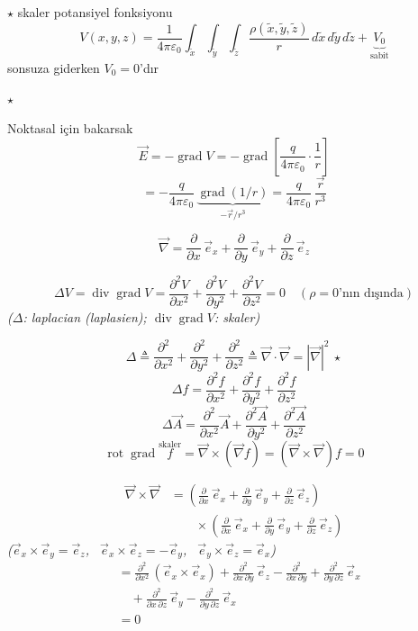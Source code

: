 \documentclass[11pt,a4paper]{article}
\begin{document}
\noindent $\star$ skaler potansiyel fonksiyonu
\[ V(x,y,z) = \frac{1}{4\pi\varepsilon_0}\int_{\tilde x}\int_{\tilde y}\int_{\tilde z}\frac{\rho(\tilde x,\tilde y,\tilde z)}{r}\,d\tilde x\,d\tilde y\,d\tilde z + \underbrace{V_0}_{\text{sabit}} \]
\noindent sonsuza giderken $V_0 = 0$'dır

\noindent $\star$

\noindent Noktasal için bakarsak
\[ \vec E = -\operatorname{grad}V = -\operatorname{grad}\left[\frac{q}{4\pi\varepsilon_0}\cdot\frac{1}{r}\right] \]
\[ = -\frac{q}{4\pi\varepsilon_0}\,\underbrace{\operatorname{grad}(1/r)}_{-\vec r/r^3} = \frac{q}{4\pi\varepsilon_0}\,\frac{\vec r}{r^3} \]


\[ \vec\nabla = \frac{\partial}{\partial x}\,\vec e_x + \frac{\partial}{\partial y}\,\vec e_y + \frac{\partial}{\partial z}\,\vec e_z \]

\[ \Delta V = \operatorname{div}\operatorname{grad}V = \frac{\partial^2 V}{\partial x^2} + \frac{\partial^2 V}{\partial y^2} + \frac{\partial^2 V}{\partial z^2} = 0 \quad (\rho = 0\text{'nın dışında}) \]
\noindent\textit{($\Delta$: laplacian (laplasien); $\operatorname{div}\operatorname{grad}V$: skaler)}

\[ \Delta \triangleq \frac{\partial^2}{\partial x^2} + \frac{\partial^2}{\partial y^2} + \frac{\partial^2}{\partial z^2} \triangleq \vec\nabla\cdot\vec\nabla = |\vec\nabla|^2 \ \star \]
\[ \Delta f = \frac{\partial^2 f}{\partial x^2} + \frac{\partial^2 f}{\partial y^2} + \frac{\partial^2 f}{\partial z^2} \]
\[ \Delta\vec A = \frac{\partial^2}{\partial x^2}\vec A + \frac{\partial^2\vec A}{\partial y^2} + \frac{\partial^2\vec A}{\partial z^2} \]
\[ \operatorname{rot}\operatorname{grad}\overset{\text{skaler}}{f} = \vec\nabla\times(\vec\nabla f) = (\vec\nabla\times\vec\nabla)f = 0 \]

\begin{align*}
\vec\nabla\times\vec\nabla &= \left(\frac{\partial}{\partial x}\,\vec e_x + \frac{\partial}{\partial y}\,\vec e_y + \frac{\partial}{\partial z}\,\vec e_z\right)\\
&\qquad \times\left(\frac{\partial}{\partial x}\,\vec e_x + \frac{\partial}{\partial y}\,\vec e_y + \frac{\partial}{\partial z}\,\vec e_z\right)
\end{align*}
\noindent\textit{($\vec e_x\times\vec e_y = \vec e_z$, \ $\vec e_x\times\vec e_z = -\vec e_y$, \ $\vec e_y\times\vec e_z = \vec e_x$)}
\begin{align*}
&= \frac{\partial^2}{\partial x^2}\,(\vec e_x\times\vec e_x) + \frac{\partial^2}{\partial x\,\partial y}\,\vec e_z - \frac{\partial^2}{\partial x\,\partial y} + \frac{\partial^2}{\partial y\,\partial z}\,\vec e_x\\
&\quad + \frac{\partial^2}{\partial x\,\partial z}\,\vec e_y - \frac{\partial^2}{\partial y\,\partial z}\,\vec e_x\\
&= 0
\end{align*}
\end{document}
